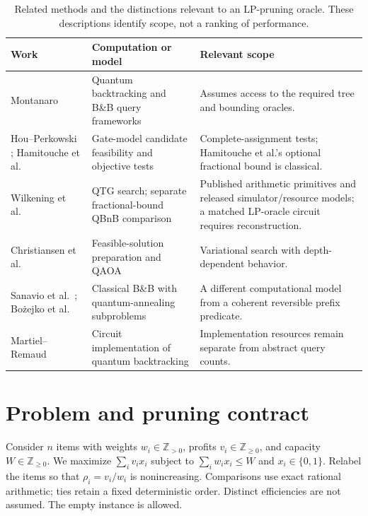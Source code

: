 \documentclass[referee,pdflatex,sn-mathphys-num]{sn-jnl}
\theoremstyle{thmstyleone}
\theoremstyle{thmstyletwo}
\begin{document}
\begin{table}[t]
\caption{Related methods and the distinctions relevant to an LP-pruning oracle. These descriptions identify scope, not a ranking of performance.}
\label{tab:related}
\centering
\small
\setlength{\tabcolsep}{5pt}
\begin{tabular}{>{\raggedright\arraybackslash}p{}>{\raggedright\arraybackslash}p{}>{\raggedright\arraybackslash}p{}}
\toprule
\textbf{Work} & \textbf{Computation or model} & \textbf{Relevant scope} \\
\midrule
Montanaro \cite{ref35,ref24} & Quantum backtracking and B\&B query frameworks & Assumes access to the required tree and bounding oracles. \\
Hou--Perkowski \cite{hou2020}; Hamitouche et al.\ \cite{hamitouche2025} & Gate-model candidate feasibility and objective tests & Complete-assignment tests; Hamitouche et al.'s optional fractional bound is classical. \\
Wilkening et al.\ \cite{wilkening2025,wilkening2025code} & QTG search; separate fractional-bound QBnB comparison & Published arithmetic primitives and released simulator/resource models; a matched LP-oracle circuit requires reconstruction. \\
Christiansen et al.\ \cite{ref23} & Feasible-solution preparation and QAOA & Variational search with depth-dependent behavior. \\
Sanavio et al.\ \cite{ref36}; Bo\.{z}ejko et al.\ \cite{bozejko2026} & Classical B\&B with quantum-annealing subproblems & A different computational model from a coherent reversible prefix predicate. \\
Martiel--Remaud \cite{martiel2019} & Circuit implementation of quantum backtracking & Implementation resources remain separate from abstract query counts. \\
\bottomrule
\end{tabular}
\end{table}



\section{Problem and pruning contract}\label{sec:model}
Consider $n$ items with weights $w_i\in\mathbb Z_{>0}$, profits $v_i\in\mathbb Z_{\geq0}$, and capacity $W\in\mathbb Z_{\geq0}$. We maximize $\sum_i v_i x_i$ subject to $\sum_i w_i x_i\leq W$ and $x_i\in\{0,1\}$. Relabel the items so that $\rho_i=v_i/w_i$ is nonincreasing. Comparisons use exact rational arithmetic; ties retain a fixed deterministic order. Distinct efficiencies are not assumed. The empty instance is allowed.
\end{document}

